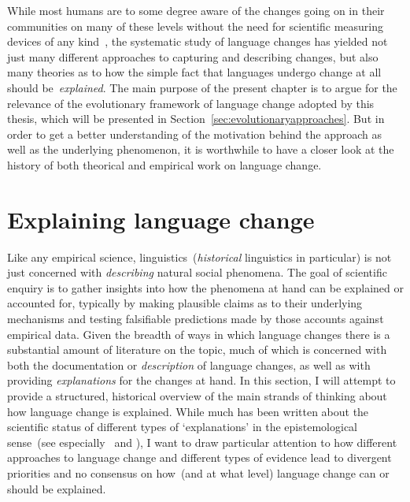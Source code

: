 While most humans are to some degree aware of the changes going on in their communities on many of these levels without the need for scientific measuring devices of any kind~\citep{Labov2001,Tagliamonte2012}, the systematic study of language changes has yielded not just many different approaches to capturing and describing changes, but also many theories as to how the simple fact that languages undergo change at all should be~\emph{explained}.
The main purpose of the present chapter is to argue for the relevance of the evolutionary framework of language change adopted by this thesis, which will be presented in Section~\ref{sec:evolutionaryapproaches}.
But in order to get a better understanding of the motivation behind the approach as well as the underlying phenomenon, it is worthwhile to have a closer look at the history of both theorical and empirical work on language change.

\section{Explaining language change}

Like any empirical science, linguistics~(\emph{historical} linguistics in particular) is not just concerned with \emph{describing} natural social phenomena. The goal of scientific enquiry is to gather insights into how the phenomena at hand can be explained or accounted for, typically by making plausible claims as to their underlying mechanisms and testing falsifiable predictions made by those accounts against empirical data. Given the breadth of ways in which language changes there is a substantial amount of literature on the topic, much of which is concerned with both the documentation or \emph{description} of language changes, as well as with providing \emph{explanations} for the changes at hand.
In this section, I will attempt to provide a structured, historical overview of the main strands of thinking about how language change is explained. While much has been written about the scientific status of different types of `explanations' in the epistemological sense~(see especially~\citealt{Lass1980,McMahon1994} and \citealt[ch.3]{Newmeyer1998}), I want to draw particular attention %
to how different approaches to language change and different types of evidence lead to divergent priorities and no consensus on how~(and at what level) language change can or should be explained.


